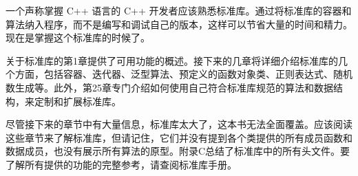 一个声称掌握 C++ 语言的 C++ 开发者应该熟悉标准库。通过将标准库的容器和算法纳入程序，而不是编写和调试自己的版本，这样可以节省大量的时间和精力。现在是掌握这个标准库的时候了。

关于标准库的第1章提供了可用功能的概述。接下来的几章将详细介绍标准库的几个方面，包括容器、迭代器、泛型算法、预定义的函数对象类、正则表达式、随机数生成等。此外，第25章专门介绍如何使用自己符合标准库规范的算法和数据结构，来定制和扩展标准库。

尽管接下来的章节中有大量信息，标准库太大了，这本书无法全面覆盖。应该阅读这些章节来了解标准库，但请记住，它们并没有提到各个类提供的所有成员函数和数据成员，也没有展示所有算法的原型。附录C总结了标准库中的所有头文件。要了解所有提供的功能的完整参考，请查阅标准库手册。




















